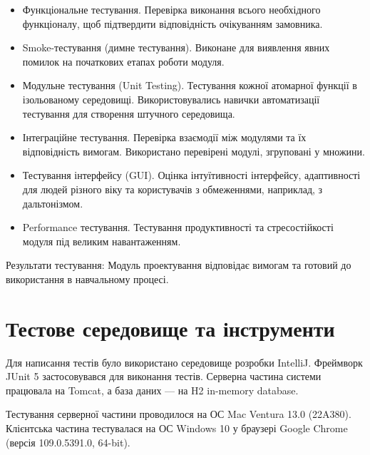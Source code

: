 \documentclass[oneside,14pt]{extarticle}
\begin{document}
\begin{normalsize}
	\begin{itemize}
		\item Функціональне тестування. Перевірка виконання всього необхідного функціоналу, щоб підтвердити відповідність очікуванням замовника.
		\item Smoke-тестування (димне тестування). Виконане для виявлення явних помилок на початкових етапах роботи модуля.
		\item Модульне тестування (Unit Testing). Тестування кожної атомарної функції в ізольованому середовищі. Використовувались навички автоматизації тестування для створення штучного середовища.
		\item Інтеграційне тестування. Перевірка взаємодії між модулями та їх відповідність вимогам. Використано перевірені модулі, згруповані у множини.
		\item Тестування інтерфейсу (GUI). Оцінка інтуїтивності інтерфейсу, адаптивності для людей різного віку та користувачів з обмеженнями, наприклад, з дальтонізмом.
		\item Performance тестування. Тестування продуктивності та стресостійкості модуля під великим навантаженням.
	\end{itemize}
	
	Результати тестування: Модуль проектування відповідає вимогам та готовий до використання в навчальному процесі.
	
	\section{Тестове середовище та інструменти}
	Для написання тестів було використано середовище розробки IntelliJ. Фреймворк JUnit 5 застосовувався для виконання тестів. Серверна частина системи працювала на Tomcat, а база даних — на H2 in-memory database.
	
	Тестування серверної частини проводилося на ОС Mac Ventura 13.0 (22A380). Клієнтська частина тестувалася на ОС Windows 10 у браузері Google Chrome (версія 109.0.5391.0, 64-bit).
	

\end{normalsize}
\end{document}
